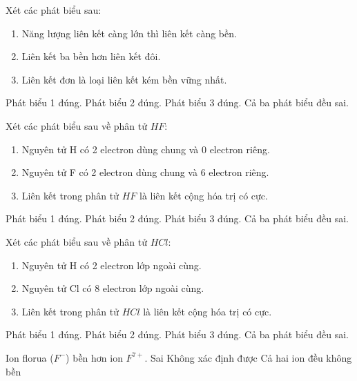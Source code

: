 \begin{ex}
	Xét các phát biểu sau:
	\begin{enumerate}
        \item Năng lượng liên kết càng lớn thì liên kết càng bền.
        \item Liên kết ba bền hơn liên kết đôi.
        \item Liên kết đơn là loại liên kết kém bền vững nhất.
	\end{enumerate}
	\choiceTF
	{\True Phát biểu 1 đúng.}
	{\True Phát biểu 2 đúng.}
	{\True Phát biểu 3 đúng.}
	{Cả ba phát biểu đều sai.}
\end{ex}

\begin{ex}
	Xét các phát biểu sau về phân tử $HF$:
	\begin{enumerate}
        \item Nguyên tử H có 2 electron dùng chung và 0 electron riêng.
        \item Nguyên tử F có 2 electron dùng chung và 6 electron riêng.
        \item Liên kết trong phân tử $HF$ là liên kết cộng hóa trị có cực.
	\end{enumerate}
	\choiceTF
	{\True Phát biểu 1 đúng.}
	{\True Phát biểu 2 đúng.}
	{\True Phát biểu 3 đúng.}
	{Cả ba phát biểu đều sai.}
\end{ex}


\begin{ex}
	Xét các phát biểu sau về phân tử $HCl$:
	\begin{enumerate}
        \item Nguyên tử H có 2 electron lớp ngoài cùng.
        \item Nguyên tử Cl có 8 electron lớp ngoài cùng.
        \item Liên kết trong phân tử $HCl$ là liên kết cộng hóa trị có cực.
	\end{enumerate}
	\choiceTF
	{\True Phát biểu 1 đúng.}
	{\True Phát biểu 2 đúng.}
	{\True Phát biểu 3 đúng.}
	{Cả ba phát biểu đều sai.}
\end{ex}

\begin{ex}
    Ion florua ($F^-$) bền hơn ion $F^{7+}$.
	{Sai}
	{Không xác định được}
	{Cả hai ion đều không bền}
\end{ex}


